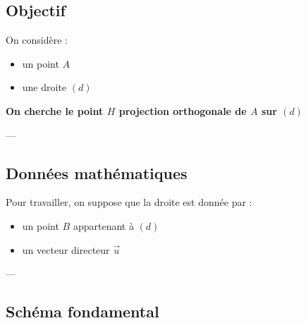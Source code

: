 \documentclass[11pt,a4paper]{article}
\begin{document}
\subsection{Objectif}

On considère :

\begin{itemize}
\item un point $A$
\item une droite $(d)$
\end{itemize}

\bigskip

\begin{center}
\textbf{On cherche le point $H$ projection orthogonale de $A$ sur $(d)$}
\end{center}

---

\subsection{Données mathématiques}

Pour travailler, on suppose que la droite est donnée par :

\begin{itemize}
\item un point $B$ appartenant à $(d)$
\item un vecteur directeur $\vec{u}$
\end{itemize}

---

\subsection{Schéma fondamental}

\begin{center}
\end{center}
\end{document}
